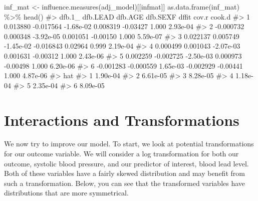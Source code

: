 \documentclass[
  letterpaper,
]{krantz}
\makeatletter
\newenvironment{Shaded}{\begin{snugshade}}{\end{snugshade}}
\newcommand{\CommentTok}[1]{\textcolor[rgb]{0.37,0.37,0.37}{#1}}
\newcommand{\FunctionTok}[1]{\textcolor[rgb]{0.28,0.35,0.67}{#1}}
\newcommand{\NormalTok}[1]{\textcolor[rgb]{0.00,0.23,0.31}{#1}}
\newcommand{\OtherTok}[1]{\textcolor[rgb]{0.00,0.23,0.31}{#1}}
\newcommand{\SpecialCharTok}[1]{\textcolor[rgb]{0.37,0.37,0.37}{#1}}
\newcommand{\StringTok}[1]{\textcolor[rgb]{0.13,0.47,0.30}{#1}}
\newenvironment{kframe}{%
\medskip{}
\setlength{\fboxsep}{.8em}
 \def\at@end@of@kframe{}%
 \ifinner\ifhmode%
  \def\at@end@of@kframe{\end{minipage}}%
  \begin{minipage}{\columnwidth}%
 \fi\fi%
 \def\FrameCommand##1{\hskip\@totalleftmargin \hskip-\fboxsep
 \colorbox{shadecolor}{##1}\hskip-\fboxsep
     \hskip-\linewidth \hskip-\@totalleftmargin \hskip\columnwidth}%
 \MakeFramed {\advance\hsize-\width
   \@totalleftmargin\z@ \linewidth\hsize
   \@setminipage}}%
 {\par\unskip\endMakeFramed%
 \at@end@of@kframe}
\renewenvironment{Shaded}{\begin{kframe}}{\end{kframe}}
\makeatother
\begin{document}
\begin{Shaded}
\begin{Highlighting}[]
\NormalTok{inf\_mat }\OtherTok{\textless{}{-}} \FunctionTok{influence.measures}\NormalTok{(adj\_model)[[}\StringTok{\textquotesingle{}infmat\textquotesingle{}}\NormalTok{]]}
\FunctionTok{as.data.frame}\NormalTok{(inf\_mat) }\SpecialCharTok{\%\textgreater{}\%} \FunctionTok{head}\NormalTok{()}
\CommentTok{\#\textgreater{}      dfb.1\_  dfb.LEAD   dfb.AGE  dfb.SEXF    dffit cov.r   cook.d}
\CommentTok{\#\textgreater{} 1  0.013880 {-}0.017564 {-}1.68e{-}02  0.008319 {-}0.03427 1.000 2.93e{-}04}
\CommentTok{\#\textgreater{} 2 {-}0.000732  0.000348 {-}3.92e{-}05  0.001051 {-}0.00150 1.000 5.59e{-}07}
\CommentTok{\#\textgreater{} 3  0.022137  0.005749 {-}1.45e{-}02 {-}0.016843  0.02964 0.999 2.19e{-}04}
\CommentTok{\#\textgreater{} 4  0.000499  0.001043 {-}2.07e{-}03  0.001631 {-}0.00312 1.000 2.43e{-}06}
\CommentTok{\#\textgreater{} 5  0.002259 {-}0.002725 {-}2.50e{-}03  0.000973 {-}0.00498 1.000 6.20e{-}06}
\CommentTok{\#\textgreater{} 6 {-}0.001283 {-}0.000559  1.65e{-}03 {-}0.002929 {-}0.00441 1.000 4.87e{-}06}
\CommentTok{\#\textgreater{}        hat}
\CommentTok{\#\textgreater{} 1 1.90e{-}04}
\CommentTok{\#\textgreater{} 2 6.61e{-}05}
\CommentTok{\#\textgreater{} 3 8.28e{-}05}
\CommentTok{\#\textgreater{} 4 1.18e{-}04}
\CommentTok{\#\textgreater{} 5 2.35e{-}04}
\CommentTok{\#\textgreater{} 6 8.09e{-}05}
\end{Highlighting}
\end{Shaded}

\section{Interactions and
Transformations}\label{interactions-and-transformations}

We now try to improve our model. To start, we look at potential
transformations for our outcome variable. We will consider a log
transformation for both our outcome, systolic blood pressure, and our
predictor of interest, blood lead level. Both of these variables have a
fairly skewed distribution and may benefit from such a transformation.
Below, you can see that the transformed variables have distributions
that are more symmetrical.
\end{document}
